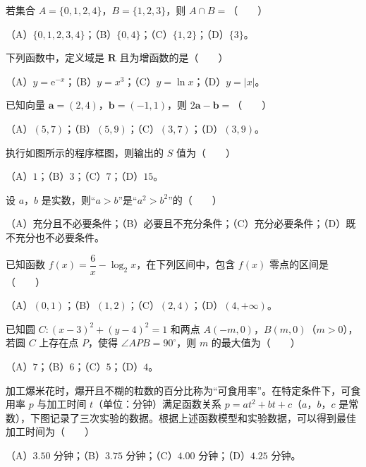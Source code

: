 \begin{question}
若集合 $A=\{0,1,2,4\}$，$B=\{1,2,3\}$，则 $A\cap B=$\mbox{（　　）}

（A）$\{0,1,2,3,4\}$；（B）$\{0,4\}$；（C）$\{1,2\}$；（D）$\{3\}$。

\end{question}
\begin{question}
下列函数中，定义域是 $\mathbf R$ 且为增函数的是\mbox{（　　）}

（A）$y=\mathrm e^{-x}$；（B）$y=x^3$；（C）$y=\ln x$；（D）$y=|x|$。

\end{question}
\begin{question}
已知向量 $\boldsymbol a=(2,4)$，$\boldsymbol b=(-1,1)$，则 $2\boldsymbol a-\boldsymbol b=$\mbox{（　　）}

（A）$(5,7)$；（B）$(5,9)$；（C）$(3,7)$；（D）$(3,9)$。

\Needspace{0.4\textheight}
\end{question}
\begin{question}
执行如图所示的程序框图，则输出的 $S$ 值为\mbox{（　　）}
\nopagebreak[4]
\begin{center}\end{center}
\nopagebreak[4]
（A）$1$；（B）$3$；（C）$7$；（D）$15$。

\end{question}
\begin{question}
设 $a$，$b$ 是实数，则“$a>b$”是“$a^2>b^2$”的\mbox{（　　）}

（A）充分且不必要条件；（B）必要且不充分条件；（C）充分必要条件；（D）既不充分也不必要条件。

\end{question}
\begin{question}
已知函数 $f(x)=\dfrac6x-\log_2x$，在下列区间中，包含 $f(x)$ 零点的区间是\mbox{（　　）}

（A）$(0,1)$；（B）$(1,2)$；（C）$(2,4)$；（D）$(4,+\infty)$。

\end{question}
\begin{question}
已知圆 $C:(x-3)^2+(y-4)^2=1$ 和两点 $A(-m,0)$，$B(m,0)$（$m>0$），若圆 $C$ 上存在点 $P$，使得 $\angle APB=90^\circ$，则 $m$ 的最大值为\mbox{（　　）}

（A）$7$；（B）$6$；（C）$5$；（D）$4$。

\Needspace{0.4\textheight}
\end{question}
\begin{question}
加工爆米花时，爆开且不糊的粒数的百分比称为“可食用率”。在特定条件下，可食用率 $p$ 与加工时间 $t$（单位：分钟）满足函数关系 $p=at^2+bt+c$（$a$，$b$，$c$ 是常数），下图记录了三次实验的数据。根据上述函数模型和实验数据，可以得到最佳加工时间为\mbox{（　　）}
\nopagebreak[4]
\begin{center}\end{center}
\nopagebreak[4]
（A）$3.50$ 分钟；（B）$3.75$ 分钟；（C）$4.00$ 分钟；（D）$4.25$ 分钟。

\end{question}

